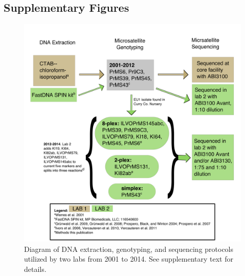 \documentclass[double,12pt]{beavtex}
\begin{document}
  \subsection{Supplementary Figures}\label{supplementary-figures}
  
  \begin{figure}
  
  {\centering \includegraphics[width=1\linewidth]{figure/phytopathology/figureS1} 
  
  }
  
  \caption[Diagram of DNA extraction, genotyping, and sequencing protocols 
  utilized by two labs from 2001 to 2014.]{Diagram of DNA extraction, genotyping, and sequencing protocols 
  utilized by two labs from 2001 to 2014. See supplementary text for details.}\label{fig:ramS1}
  \end{figure}
  
\end{document}
